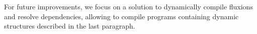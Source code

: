 For future improvements, we focus on a solution to dynamically compile fluxions and resolve dependencies, allowing to compile programs containing dynamic structures described in the last paragraph.







 
 






